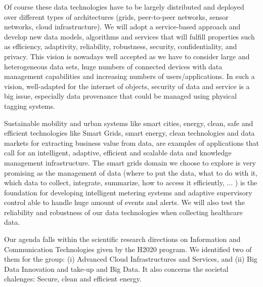 Of course these data technologies have to  be largely distributed and deployed over different types of architectures (grids, peer-to-peer networks, sensor networks, cloud infrastructure). 
We will adopt a service-based approach and  develop new data models,  algorithms and  services that will fulfill  properties such as efficiency, adaptivity, reliability, robustness, security, confidentiality, and privacy. 
This vision is nowadays well accepted as we have to consider large and heterogeneous data sets, huge numbers of connected devices with data management capabilities and increasing numbers of users/applications. In such a vision, well-adapted for the internet of objects, security of data and service is a big issue, especially data provenance that could be managed using physical tagging systems.

Sustainable mobility and urban systems like smart cities, energy, clean, safe and efficient technologies like Smart Grids, smart energy, clean technologies and  data markets for extracting business value from data, are examples of applications that call for an intelligent, adaptive, efficient and scalable data and knowledge management infrastructure. The smart grids domain we choose to explore is very promising as the management of data (where to put the data, what to do with it, which data to collect,  integrate, summarize, how to access it efficiently, ... ) is the foundation for developing intelligent metering systems and adaptive supervisory control able to handle huge amount of events and alerts.  
We will also test the reliability and robustness of our data technologies when collecting healthcare data. 

Our agenda falls within the  scientific research directions on Information and Communication Technologies given by  the H2020 program. We identified two of them for the group: (i) Advanced Cloud Infrastructures and Services, and (ii) Big Data Innovation and take-up and Big Data. 
It also concerns the societal chalenges: Secure, clean and efficient energy. 

